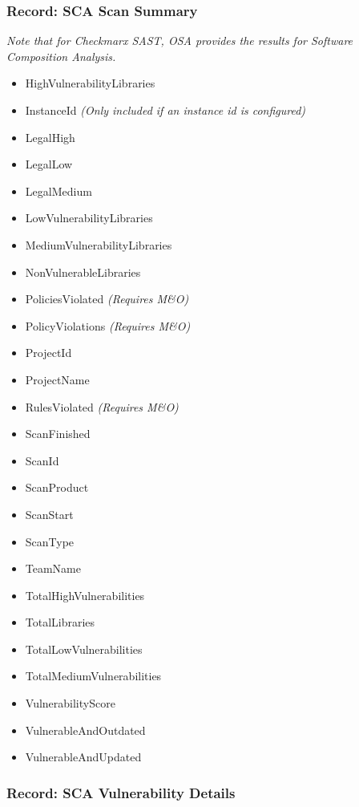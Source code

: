 \subsubsection{Record: SCA Scan Summary}

\textit{Note that for Checkmarx SAST, OSA provides the results for Software Composition Analysis.}

\begin{itemize}
    \item HighVulnerabilityLibraries
    \item InstanceId \textit{(Only included if an instance id is configured)}
    \item LegalHigh
    \item LegalLow
    \item LegalMedium
    \item LowVulnerabilityLibraries
    \item MediumVulnerabilityLibraries
    \item NonVulnerableLibraries
    \item PoliciesViolated \textit{(Requires M\&O)}
    \item PolicyViolations \textit{(Requires M\&O)}
    \item ProjectId
    \item ProjectName
    \item RulesViolated \textit{(Requires M\&O)}
    \item ScanFinished
    \item ScanId
    \item ScanProduct
    \item ScanStart
    \item ScanType
    \item TeamName
    \item TotalHighVulnerabilities
    \item TotalLibraries
    \item TotalLowVulnerabilities
    \item TotalMediumVulnerabilities
    \item VulnerabilityScore
    \item VulnerableAndOutdated
    \item VulnerableAndUpdated
\end{itemize}

\subsubsection{Record: SCA Vulnerability Details}


